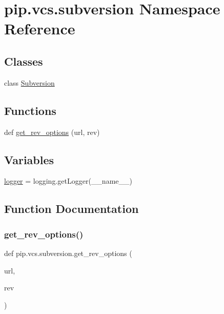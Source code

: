 \hypertarget{namespacepip_1_1vcs_1_1subversion}{}\section{pip.\+vcs.\+subversion Namespace Reference}
\label{namespacepip_1_1vcs_1_1subversion}
\subsection*{Classes}
\begin{DoxyCompactItemize}
\item 
class \hyperlink{classpip_1_1vcs_1_1subversion_1_1_subversion}{Subversion}
\end{DoxyCompactItemize}
\subsection*{Functions}
\begin{DoxyCompactItemize}
\item 
def \hyperlink{namespacepip_1_1vcs_1_1subversion_aba0433ef84de9effb107ad73c2c03318}{get\+\_\+rev\+\_\+options} (url, rev)
\end{DoxyCompactItemize}
\subsection*{Variables}
\begin{DoxyCompactItemize}
\item 
\hyperlink{namespacepip_1_1vcs_1_1subversion_a91690c24b639a63f8cabf5c88742a27c}{logger} = logging.\+get\+Logger(\+\_\+\+\_\+name\+\_\+\+\_\+)
\end{DoxyCompactItemize}


\subsection{Function Documentation}
\mbox{\label{namespacepip_1_1vcs_1_1subversion_aba0433ef84de9effb107ad73c2c03318}} 
\subsubsection{\texorpdfstring{get\+\_\+rev\+\_\+options()}{get\_rev\_options()}}
{\footnotesize\ttfamily def pip.\+vcs.\+subversion.\+get\+\_\+rev\+\_\+options (\begin{DoxyParamCaption}\item[{}]{url,  }\item[{}]{rev }\end{DoxyParamCaption})}



